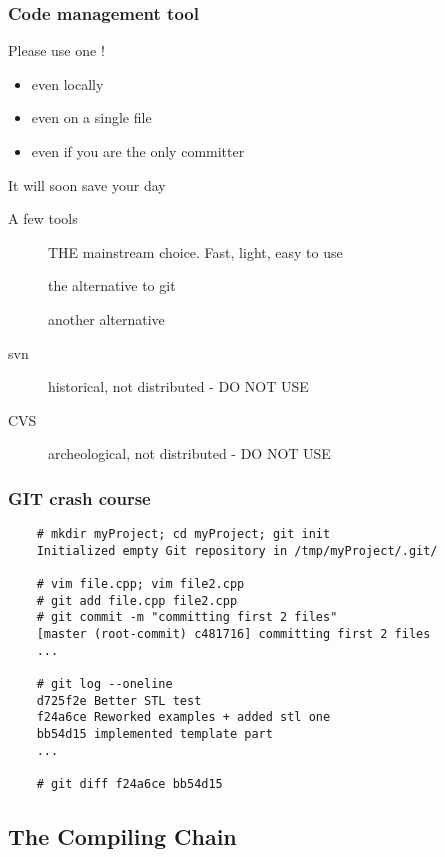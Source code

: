 \begin{frame}[fragile]
  \frametitle{Code management tool}
  \begin{alertblock}{Please use one !}
    \begin{itemize}
    \item even locally
    \item even on a single file
    \item even if you are the only committer
    \end{itemize}
    It will soon save your day
  \end{alertblock}
  \begin{block}{A few tools}
    \begin{description}
    \item[\href{http://git-scm.com/}{}]
      THE mainstream choice. Fast, light, easy to use
    \item[\href{http://mercurial.selenic.com/}{}]
      the alternative to git
    \item[\href{http://bazaar.canonical.com/en/}{}]
      another alternative
    \item[svn]
      historical, not distributed - DO NOT USE
    \item[CVS]
      archeological, not distributed - DO NOT USE
    \end{description}
  \end{block}
\end{frame}

\begin{frame}[fragile]
  \frametitle{GIT crash course}
  \begin{verbatim}
    # mkdir myProject; cd myProject; git init
    Initialized empty Git repository in /tmp/myProject/.git/

    # vim file.cpp; vim file2.cpp
    # git add file.cpp file2.cpp
    # git commit -m "committing first 2 files"
    [master (root-commit) c481716] committing first 2 files
    ...

    # git log --oneline
    d725f2e Better STL test
    f24a6ce Reworked examples + added stl one
    bb54d15 implemented template part
    ...

    # git diff f24a6ce bb54d15
  \end{verbatim}
\end{frame}

\subsection[gcc]{The Compiling Chain}

